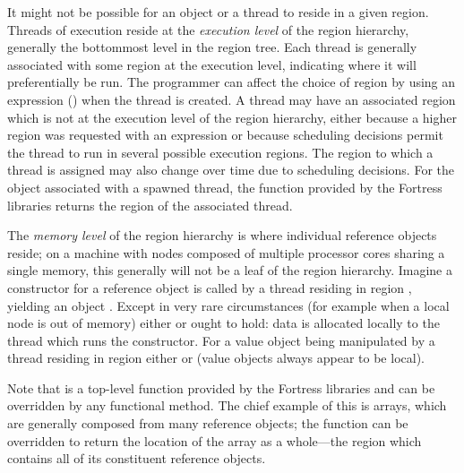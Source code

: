 It might not be possible for an object or a thread to reside in a given
region.  Threads of execution reside at the \emph{execution level} of
the region hierarchy, generally the bottommost level in the region
tree.  Each thread is generally associated with some region at the
execution level, indicating where it will preferentially be run.
The programmer can affect the choice of region by using an 
expression () when the thread is
created.  A thread may have an associated region which is not at
the execution level of the region hierarchy, either because a higher
region was requested with an  expression or because scheduling
decisions permit the thread to run in several possible execution
regions.  The region to which a thread is assigned may also change
over time due to scheduling decisions.
For the object associated with a spawned thread,
the  function provided by the Fortress libraries
returns the region of the associated thread.


The \emph{memory level} of the region hierarchy is where individual
reference objects reside; on a machine with nodes composed of multiple
processor cores sharing a single memory, this generally will not be a
leaf of the region hierarchy.
Imagine a constructor for a reference
object is called by a thread residing in region , yielding an
object .  Except in very rare circumstances (for example when a
local node is out of memory) either
 or
 ought to hold: data is
allocated locally to the thread which runs the constructor.  For a value object
 being manipulated by a thread residing in region  either
 or
(value objects always appear to be local).

Note that  is a top-level function provided by the Fortress libraries
and can be overridden by any functional method.
The chief example of this is arrays, which are
generally composed from many reference objects; the  function
can be
overridden to return the location of the array as a
whole---the region which contains all of its constituent reference objects.
